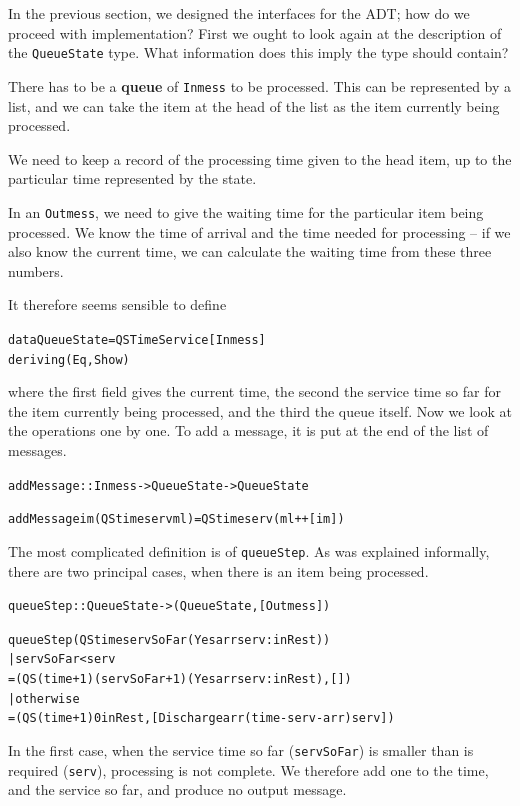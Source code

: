 In the previous section, we designed the interfaces for the ADT;
how do we proceed with implementation? First we ought to look again at the
description of the \texttt{QueueState} type. What information does this imply
the type should contain?
\begin{titemize}
\item There has to be a \textbf{queue} of \texttt{Inmess} to be processed. This
can be represented by a list, and we can take the item at the head of the
list as the item currently being processed.
\item We need to keep a record of the processing time given to the head item,
up to the particular time represented by the state.
\item In an \texttt{Outmess}, we need to give the waiting
time for the particular item being processed. We know the time of arrival
and the time needed for processing -- if we also know the current time, we
can calculate the waiting time from these three numbers.
\end{titemize} 
It therefore seems sensible to define
\begin{alltt}
data QueueState = QS Time Service [Inmess]
                  deriving (Eq, Show)
\end{alltt}
where the first field gives the current time, the second the service time so
far for the item currently being processed,
and the third the queue itself. Now we look at the operations one by one.
To add a message, it is put at the end of the list of messages.
\begin{alltt}
addMessage  :: Inmess -> QueueState -> QueueState

addMessage im (QS time serv ml) = QS time serv (ml++[im])
\end{alltt}
The most complicated definition is of \texttt{queueStep}. As was explained
informally, there are two principal cases, when there is an item being
processed.
\begin{alltt}
queueStep   :: QueueState -> ( QueueState , [Outmess] )

queueStep (QS time servSoFar (Yes arr serv : inRest))
  | servSoFar < serv
    = (QS (time+1) (servSoFar+1) (Yes arr serv : inRest) , [])
  | otherwise
    = (QS (time+1) 0 inRest , [Discharge arr (time-serv-arr) serv])
\end{alltt}
In the first case, when the service time so far (\texttt{servSoFar}) is smaller
than is required (\texttt{serv}), processing is not complete. We therefore add one to
the time, and the service so far, and produce no output message. 
 
